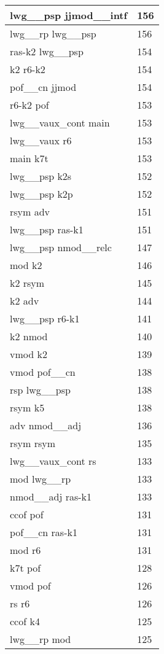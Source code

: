 \documentclass[a4 paper]{article}
\begin{document}
\begin{longtable}{p{}p{}}
lwg\_\_psp jjmod\_\_intf  & 156 \\ \midrule
lwg\_\_rp lwg\_\_psp  & 156 \\ \midrule
ras-k2 lwg\_\_psp  & 154 \\ \midrule
k2 r6-k2  & 154 \\ \midrule
pof\_\_cn jjmod  & 154 \\ \midrule
r6-k2 pof  & 153 \\ \midrule
lwg\_\_vaux\_cont main  & 153 \\ \midrule
lwg\_\_vaux r6  & 153 \\ \midrule
main k7t  & 153 \\ \midrule
lwg\_\_psp k2s  & 152 \\ \midrule
lwg\_\_psp k2p  & 152 \\ \midrule
rsym adv  & 151 \\ \midrule
lwg\_\_psp ras-k1  & 151 \\ \midrule
lwg\_\_psp nmod\_\_relc  & 147 \\ \midrule
mod k2  & 146 \\ \midrule
k2 rsym  & 145 \\ \midrule
k2 adv  & 144 \\ \midrule
lwg\_\_psp r6-k1  & 141 \\ \midrule
k2 nmod  & 140 \\ \midrule
vmod k2  & 139 \\ \midrule
vmod pof\_\_cn  & 138 \\ \midrule
rsp lwg\_\_psp  & 138 \\ \midrule
rsym k5  & 138 \\ \midrule
adv nmod\_\_adj  & 136 \\ \midrule
rsym rsym  & 135 \\ \midrule
lwg\_\_vaux\_cont rs  & 133 \\ \midrule
mod lwg\_\_rp  & 133 \\ \midrule
nmod\_\_adj ras-k1  & 133 \\ \midrule
ccof pof  & 131 \\ \midrule
pof\_\_cn ras-k1  & 131 \\ \midrule
mod r6  & 131 \\ \midrule
k7t pof  & 128 \\ \midrule
vmod pof  & 126 \\ \midrule
rs r6  & 126 \\ \midrule
ccof k4  & 125 \\ \midrule
lwg\_\_rp mod  & 125 \\ \midrule

\end{longtable}
\end{document}
